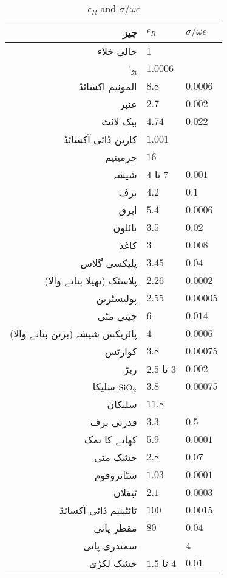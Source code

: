 {\renewcommand{\arraystretch}{1.2}
\begin{table}
\caption{$\epsilon_R$ and $\sigma/\omega \epsilon$}
\centering
\begin{tabular}{r | l | l}
\hline
چیز & $\epsilon_R$ & $\sigma/\omega \epsilon$\\
\hline
خالی خلاء & 1 &  \\
ہوا&  $\num{1.0006}$&  \\
المونیم اکسائڈ  & $\num{8.8}$ & $\num{0.0006}$\\
عنبر  & $\num{2.7}$& $\num{0.002}$ \\
بیک لائٹ  & $\num{4.74}$& $\num{0.022}$ \\
کاربن ڈائی آکسائڈ &$\num{1.001}$&\\
جرمینیم&$\num{16}$&\\
شیشہ & $4$ تا $7$ & $\num{0.001}$\\
برف & $\num{4.2}$& $\num{0.1}$ \\
ابرق   & $\num{5.4}$ & $\num{0.0006}$\\
نائلون  & $\num{3.5}$ & $\num{0.02}$\\
کاغذ  & $\num{3}$ & $\num{0.008}$\\
پلیکسی گلاس  & $\num{3.45}$ & $\num{0.04}$\\
پلاسٹک (تھیلا بنانے والا)   & $\num{2.26}$ & $\num{0.0002}$ \\
پولیسٹرین & $\num{2.55}$ & $\num{0.00005}$ \\
چینی مٹی & $\num{6}$ & $\num{0.014}$ \\
پائریکس شیشہ (برتن بنانے والا)  & $\num{4}$& $\num{0.0006}$ \\
کوارٹس  & $\num{3.8}$ & $\num{0.00075}$ \\
ربڑ & $2.5$ تا $3$ & $\num{0.002}$\\
سلیکا  $\ce{SiO2}$ & $\num{3.8}$ & $\num{0.00075}$ \\
سلیکان& $\num{11.8}$ &  \\
قدرتی برف& $\num{3.3}$ & $\num{0.5}$ \\
کھانے کا نمک& $\num{5.9}$ & $\num{0.0001}$ \\
خشک مٹی& $\num{2.8}$ & $\num{0.07}$ \\
سٹائروفوم  & $\num{1.03}$ & $\num{0.0001}$ \\
ٹیفلان & $\num{2.1}$ & $\num{0.0003}$ \\
ٹائٹینیم ڈائی آکسائڈ & $\num{100}$ & $\num{0.0015}$ \\
مقطر پانی & $\num{80}$ & $\num{0.04}$ \\
سمندری پانی&  & $\num{4}$ \\
خشک لکڑی&$1.5$ تا $4$ & $\num{0.01}$ \\
\end{tabular}
\label{جدول_جدول_جزوی_برقی_مستقل_زاویہ_زیاع}
\end{table}
}
